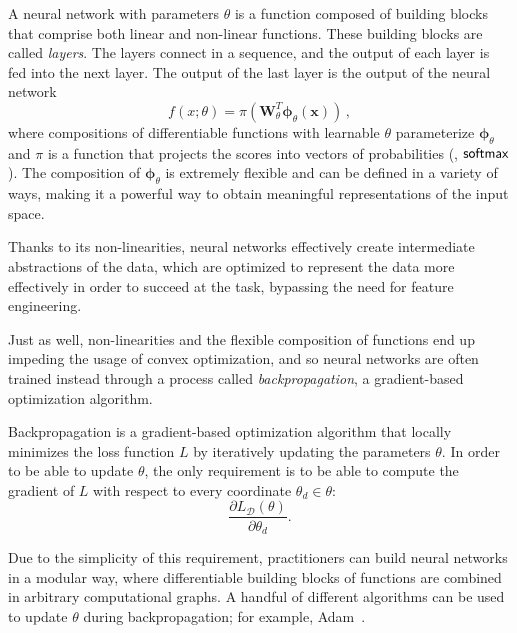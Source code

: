\begin{definition}
    A neural network with parameters $\theta$ is a function
    composed of building blocks that comprise both linear and non-linear
    functions. These building blocks are called \textit{layers}.
    The layers connect in a sequence, and the output of each
    layer is fed into the next layer. The output of the last layer is
    the output of the neural network
    \begin{equation}
        f(x; \theta) = \pi 
        \left(\bm{W}_{\theta}^T\bm{\phi}_{\theta}\left(\bm{x}\right)\right)\,,
    \end{equation}
    where compositions of differentiable functions with learnable
    $\theta$ parameterize $\bm{\phi}_{\theta}$ and $\pi$ is a
    function that projects the scores into vectors of probabilities (\eg, $\operatorname*{\mathsf{softmax}}$).
    The composition of $\bm{\phi}_{\theta}$ is extremely flexible and
    can be defined in a variety of ways, making it a powerful way to
    obtain meaningful representations of the input space.
\end{definition}
%
Thanks to its non-linearities, neural networks effectively create
intermediate abstractions of the data, which are optimized to represent the data
more effectively in order to succeed at the task, bypassing the need
for feature engineering.

Just as well, non-linearities and the flexible composition of functions end up
impeding the usage of convex optimization, and so neural networks are
often trained instead through a process called
\textit{backpropagation}, a gradient-based optimization algorithm.

\newpage

\begin{definition}[backpropagation]
    Backpropagation is a gradient-based optimization algorithm that
    locally minimizes the loss function $L$ by iteratively updating the
    parameters $\theta$. In order to be able to update $\theta$,
    the only requirement is to be able to compute the gradient of
    $L$ with respect to every coordinate $\theta_d\in\theta$:
    \begin{equation}
        \frac{\partial L_{\mathcal{D}}(\theta)}{\partial \theta_d}.
        \label{eq:backprop}
    \end{equation}
\end{definition}

Due to the simplicity of this requirement, practitioners can build
neural networks in a modular way, where differentiable building
blocks of functions are combined in arbitrary computational graphs. A
handful of different algorithms can be used to update $\theta$ during
backpropagation; for example, Adam~\citep{kingma2014adam}.

